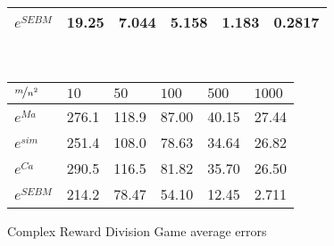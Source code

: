 \begin{table*}[h]
\begin{subfigure}[]{0.8\textwidth}
\begin{tabular}{llllll}
			$e^{SEBM}$  & 19.25 & 7.044 & 5.158 & 1.183 & 0.2817  \\
			\hline
			\end{tabular}
    \end{subfigure}
	\\\vspace{4mm}
    \begin{subfigure}[]{0.8\textwidth}
        \centering
        \caption{Complex Reward Division Game average errors}\label{tab4}
			\centering
			\begin{tabular}{llllll}
			\hline
			$\nicefrac{m}{n^2}$ & $10$ & $50$ & $100$ & $500$ & $1000$ \\
			\hline
			$e^{Ma}$   & 276.1 & 118.9 & 87.00 & 40.15 & 27.44 \\
			$e^{sim}$  & 251.4 & 108.0 & 78.63 & 34.64 & 26.82 \\
			$e^{Ca}$   & 290.5 & 116.5 & 81.82 & 35.70 & 26.50 \\
			$e^{SEBM}$ & 214.2 & 78.47 & 54.10 & 12.45 & 2.711  \\
			\hline
			\end{tabular}
    \end{subfigure}
    \vspace{3mm}
    \caption{Average absolute errors in the Shapley value calculation across all players in the four cooperative games (units in $10^{-4}$), for the different sampling schemes with different sampling budgets $m$ per number of strata (with $n^2=15^2$ for all).}
    \label{Table2}
\end{table*}


